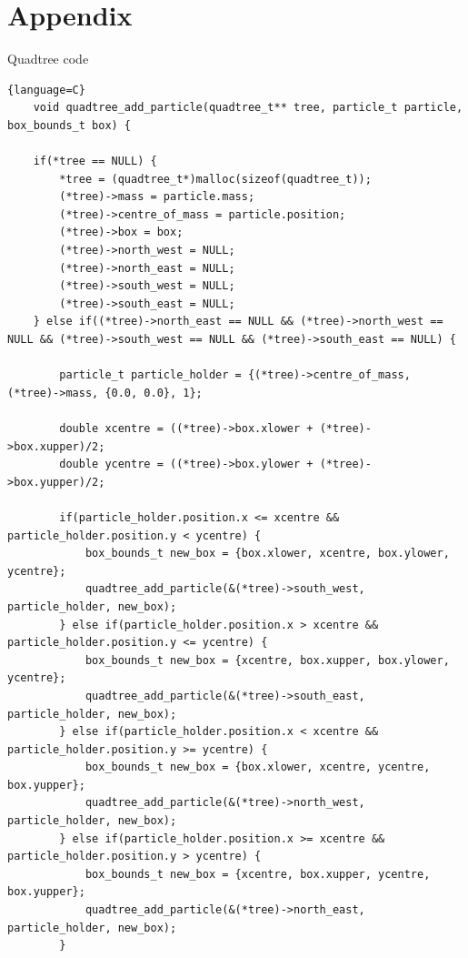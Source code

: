 \documentclass{article}
\begin{document}
\section{Appendix}
\begin{center}
    Quadtree code
\end{center}
\begin{lstlisting}{language=C}
    void quadtree_add_particle(quadtree_t** tree, particle_t particle, box_bounds_t box) {

    if(*tree == NULL) {
        *tree = (quadtree_t*)malloc(sizeof(quadtree_t));
        (*tree)->mass = particle.mass;
        (*tree)->centre_of_mass = particle.position;
        (*tree)->box = box;
        (*tree)->north_west = NULL;
        (*tree)->north_east = NULL;
        (*tree)->south_west = NULL;
        (*tree)->south_east = NULL;
    } else if((*tree)->north_east == NULL && (*tree)->north_west == NULL && (*tree)->south_west == NULL && (*tree)->south_east == NULL) {

        particle_t particle_holder = {(*tree)->centre_of_mass, (*tree)->mass, {0.0, 0.0}, 1};

        double xcentre = ((*tree)->box.xlower + (*tree)->box.xupper)/2;
        double ycentre = ((*tree)->box.ylower + (*tree)->box.yupper)/2;

        if(particle_holder.position.x <= xcentre && particle_holder.position.y < ycentre) {
            box_bounds_t new_box = {box.xlower, xcentre, box.ylower, ycentre};
            quadtree_add_particle(&(*tree)->south_west, particle_holder, new_box);
        } else if(particle_holder.position.x > xcentre && particle_holder.position.y <= ycentre) {
            box_bounds_t new_box = {xcentre, box.xupper, box.ylower, ycentre};
            quadtree_add_particle(&(*tree)->south_east, particle_holder, new_box);
        } else if(particle_holder.position.x < xcentre && particle_holder.position.y >= ycentre) {
            box_bounds_t new_box = {box.xlower, xcentre, ycentre, box.yupper};
            quadtree_add_particle(&(*tree)->north_west, particle_holder, new_box);
        } else if(particle_holder.position.x >= xcentre && particle_holder.position.y > ycentre) {
            box_bounds_t new_box = {xcentre, box.xupper, ycentre, box.yupper};
            quadtree_add_particle(&(*tree)->north_east, particle_holder, new_box);
        }


\end{lstlisting}
\end{document}
